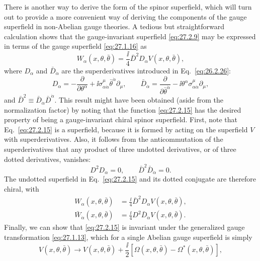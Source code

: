 There is another way to derive the form of the spinor superfield, which
will turn out to provide a more convenient way of deriving the components
of the gauge superfield in non-Abelian gauge theories. A tedious but
straightforward calculation shows that the gauge-invariant superfield
\eqref{eq:27.2.9} may be expressed in terms of the gauge superfield
\eqref{eq:27.1.16} as
\begin{equation}
  W_\alpha(x,\theta,\bar\theta)
  =\frac{\ii}{4}\bar D^2D_\alpha V(x,\theta,\bar\theta),
  \tag{27.2.15}\label{eq:27.2.15}
\end{equation}
where \(D_\alpha\) and \(\bar D_{\dot\alpha}\) are the superderivatives
introduced in Eq.~\eqref{eq:26.2.26}:
\[
  D_\alpha=-\frac{\partial}{\partial\theta^\alpha}
    +\ii\sigma^\mu_{\alpha\dot\alpha}\bar\theta^{\dot\alpha}\partial_\mu,
  \qquad
  \bar D_{\dot\alpha}
    =\frac{\partial}{\partial\bar\theta^{\dot\alpha}}
      -\ii\theta^\alpha\sigma^\mu_{\alpha\dot\alpha}\partial_\mu,
\]
and \(\bar D^2\equiv\bar D_{\dot\alpha}\bar D^{\dot\alpha}\).
This result might have been obtained (aside from the normalization factor)
by noting that the function \eqref{eq:27.2.15} has the desired property of
being a gauge-invariant chiral spinor superfield. First, note that
Eq.~\eqref{eq:27.2.15} is a superfield, because it is formed by acting on
the superfield \(V\) with superderivatives. Also, it follows from the
anticommutation of the superderivatives that any product of three
undotted derivatives, or of three dotted derivatives, vanishes:
\begin{equation}
  D^2D_\alpha=0,
  \qquad
  \bar D^2\bar D_{\dot\alpha}=0.
  \tag{27.2.16}\label{eq:27.2.16}
\end{equation}
The undotted superfield in Eq.~\eqref{eq:27.2.15} and its dotted conjugate
are therefore chiral, with
\begin{equation}
  \begin{aligned}
  W_\alpha(x,\theta,\bar\theta)
  &=\frac{\ii}{4}\bar D^2D_\alpha V(x,\theta,\bar\theta),
  \\
  \bar W_{\dot\alpha}(x,\theta,\bar\theta)
  &=\frac{\ii}{4}D^2\bar D_{\dot\alpha}V(x,\theta,\bar\theta).
  \end{aligned}
  \tag{27.2.17}\label{eq:27.2.17}
\end{equation}
Finally, we can show that \eqref{eq:27.2.15} is invariant under the
generalized gauge transformation \eqref{eq:27.1.13}, which for a single
Abelian gauge superfield is simply
\begin{equation}
  V(x,\theta,\bar\theta)\longrightarrow
  V(x,\theta,\bar\theta)+\frac{\ii}{2}
  \left[\Omega(x,\theta,\bar\theta)
    -\Omega^*(x,\theta,\bar\theta)\right],
  \tag{27.2.18}\label{eq:27.2.18}
\end{equation}
